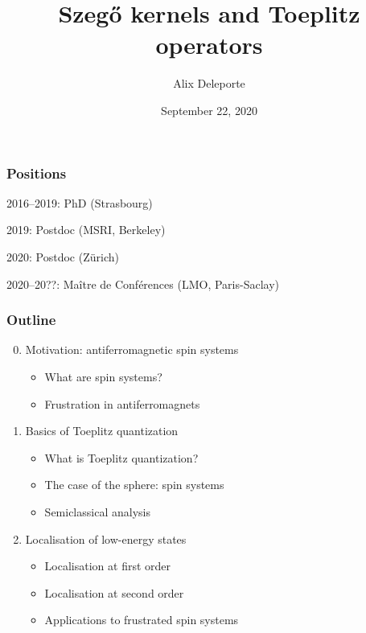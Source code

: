 \documentclass[mathserif]{beamer}
\title{Szeg\H{o} kernels and Toeplitz operators}
\author{Alix Deleporte}
\date{September 22, 2020}
\institute[LMO]{Laboratoire de Mathématiques d'Orsay\\Université Paris-Saclay}
\begin{document}
\beamertemplatenavigationsymbolsempty

    \expandafter\def\expandafter\insertshorttitle\expandafter{%
       \insertshorttitle\hfill%
       }%


\begin{frame}
	\titlepage
      \end{frame}

      \begin{frame}
  \frametitle{Positions}
  2016--2019: PhD (Strasbourg)

  \vfill

  2019: Postdoc (MSRI, Berkeley)

  \vfill

  2020: Postdoc (Zürich)
  
  \vfill
  
  2020--20??: Maître de Conférences (LMO, Paris-Saclay)
\end{frame}

      \begin{frame}
        \frametitle{Outline}
        \begin{enumerate}\setcounter{enumi}{-1}
        \item Motivation: antiferromagnetic spin systems
          \begin{itemize}
          \item What are spin systems?
          \item Frustration in antiferromagnets
          \end{itemize}
        \item Basics of Toeplitz quantization
          \begin{itemize}
          \item What is Toeplitz quantization?
          \item The case of the sphere: spin systems
          \item Semiclassical analysis
          \end{itemize}
        \item Localisation of low-energy states
          \begin{itemize}
          \item Localisation at first order
          \item Localisation at second order
          \item Applications to frustrated spin systems
          \end{itemize}
        \end{enumerate}
      \end{frame}
\end{document}
